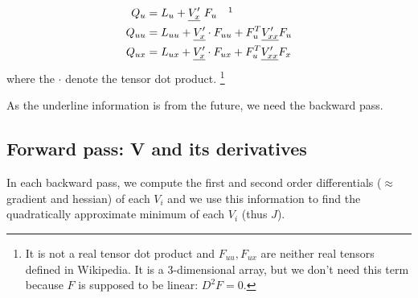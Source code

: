 \documentclass{report}
\begin{document}
\begin{equation}
\label{QfromV}
\begin{split}
Q_u & = L_u + \underline{V'_x}   \ F_u \quad \footnotemark \\
Q_{uu} &= L_{uu} + \underline{V'_x} \cdot F_{uu} + F_u^T \underline{V'_{xx}} F_u \\
Q_{ux} &= L_{ux} + \underline{V'_x} \cdot F_{ux} + F_u^T \underline{V'_{xx}} F_x
\end{split}
\end{equation}
where the $\cdot$ denote the tensor dot product.
\footnote{It is not a real tensor dot product and $F_{uu}, F_{ux}$ are neither real tensors defined in Wikipedia. It is a 3-dimensional array, but we don't need this term because $F$ is supposed to be linear: $D^2F = 0$.}


As the underline information is from the future, we need the backward pass.

\subsection{Forward pass: V and its derivatives}
In each backward pass, we compute the first and second order differentials ($\approx$gradient and hessian) of each $V_i$ and we use this information to find the quadratically approximate minimum of each $V_i$ (thus $J$).%
\end{document}
